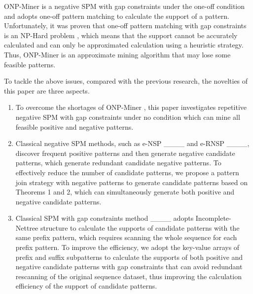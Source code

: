 ONP-Miner is a negative SPM with gap constraints under the one-off condition and adopts one-off pattern matching to calculate the support of a pattern. Unfortunately, it was proven that one-off pattern matching with gap constraints is an NP-Hard problem \cite {28_Wu2021, oneoff2}, which means that the support cannot be accurately calculated and can only be approximated calculation using a heuristic strategy. Thus, ONP-Miner is an approximate mining algorithm that may lose some feasible patterns. 


{To tackle the above issues, compared with the previous research, the novelties of this paper are three aspects. }

\begin {enumerate}
\item { To overcome the shortages of ONP-Miner \cite {onpminer}, this paper investigates repetitive negative SPM with gap constraints under no condition which can mine all feasible positive and negative patterns.}

\item {Classical negative SPM methods, such as e-NSP ____ and e-RNSP ____, discover frequent positive patterns and then generate negative candidate patterns, which generate redundant candidate negative patterns. To effectively reduce the number of candidate patterns, we propose a pattern join strategy with negative patterns to generate candidate patterns based on Theorems 1 and 2, which can simultaneously generate both positive and negative candidate patterns.}

\item { Classical SPM with gap constraints method ____ adopts Incomplete-Nettree structure to calculate the supports of candidate patterns with the same prefix pattern, which requires scanning the whole sequence for each prefix pattern. To improve the efficiency, we adopt the key-value arrays of prefix and suffix subpatterns to calculate the supports of both positive and negative candidate patterns with gap constraints that can avoid redundant rescanning of the original sequence dataset, thus improving the calculation efficiency of the support of candidate patterns.}

\end {enumerate}
